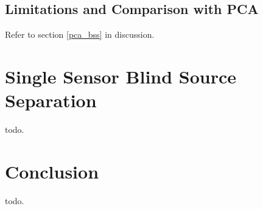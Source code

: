 \documentclass[11pt, oneside, a4paper]{report}
\begin{document}
\section{Limitations and Comparison with PCA}\label{ica_conclusions}

Refer to section \ref{pca_bss} in discussion.


\chapter{Single Sensor Blind Source Separation}\label{ssbss_chap}

todo.

\chapter{Conclusion}

todo.

\begin{thebibliography}{9}



  
\end{thebibliography}
\end{document}
